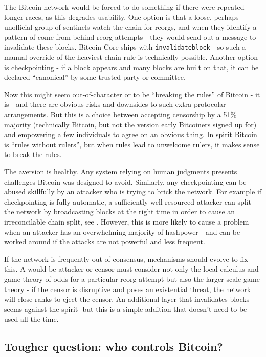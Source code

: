 \documentclass{article}%
\begin{document}
The Bitcoin network would be forced to do something if there were repeated
longer races, as this degrades usability.  One option is that a
loose, perhaps unofficial group of sentinels watch the chain for reorgs, and
when they identify a pattern of come-from-behind reorg attempts - they would
send out a message to invalidate these blocks.  Bitcoin Core ships with
\texttt{invalidateblock} - so such a manual override of the heaviest chain rule is
technically possible.  Another option is checkpointing - if a block appears
and many blocks are built on that, it can be declared ``canonical'' by some
trusted party or committee.

Now this might seem out-of-character or to be ``breaking the rules'' of Bitcoin - it is -
and there are obvious risks and downsides to such extra-protocolar arrangements. But this is a
choice between accepting censorship by a 51\% majority (technically Bitcoin,
but not the version early Bitcoiners signed up for) and empowering a few individuals to agree on
an obvious thing. In spirit Bitcoin is \textquotedblleft rules without
rulers'', but when rules lead to unwelcome rulers, it makes sense to break the
rules.

The aversion is healthy.  Any system relying on human judgments presents challenges Bitcoin was designed to avoid.  Similarly, any checkpointing can be abused skillfully by an
attacker who is trying to brick the network. For example if checkpointing is fully
automatic, a sufficiently well-resourced attacker can split the network by
broadcasting blocks at the right time in order to cause an irreconcilable chain split,
see \cite[Chapter 13]{Warren23}. However, this is more likely to cause a
problem when an attacker has an overwhelming majority of hashpower - and can
be worked around if the attacks are not powerful and less frequent.

If the network is frequently out of consensus,  mechanisms should evolve to
fix this.   A would-be attacker or censor must consider not only the
local calculus and game theory of odds for a particular reorg attempt but
also the larger-scale game theory - if the censor is disruptive and poses an
existential threat, the network will close ranks to eject the censor.  An
additional layer that invalidates blocks seems against the spirit- but this is a
simple addition that doesn't need to be used all the time.

\subsection{Tougher question: who controls Bitcoin?}
\end{document}
